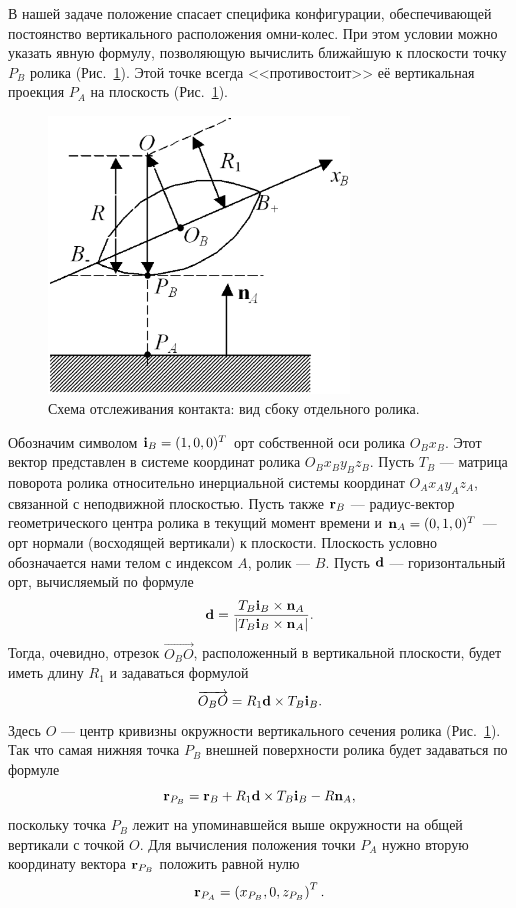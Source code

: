 \documentclass[12pt,a4paper]{article}
\begin{document}
В нашей задаче положение спасает специфика конфигурации, обеспечивающей 
постоянство вертикального расположения омни-колес. При этом условии можно
указать явную формулу, позволяющую вычислить ближайшую к плоскости точку $P_B$
ролика (Рис.~\ref{ContactScheme}). Этой точке всегда <<противостоит>> её 
вертикальная проекция $P_A$ на плоскость (Рис.~\ref{ContactScheme}).
\begin{figure}[htb]
\centering\includegraphics[width=8cm]{RollerSection.eps}
\caption{Схема отслеживания контакта: вид сбоку отдельного ролика.}
\label{ContactScheme}
\end{figure}

Обозначим символом ${\bf i}_B=(1,0,0)^T$ орт собственной оси ролика $O_Bx_B$.
Этот вектор представлен в системе координат ролика $O_Bx_By_Bz_B$. Пусть $T_B$
--- матрица поворота ролика относительно инерциальной системы координат 
$O_Ax_Ay_Az_A$, связанной с неподвижной плоскостью. Пусть также ${\bf r}_B$ ---
радиус-вектор геометрического центра ролика в текущий момент времени и 
${\bf n}_A=(0,1,0)^T$ --- орт нормали (восходящей вертикали) к плоскости. 
Плоскость условно обозначается нами телом с индексом $A$, ролик --- $B$. Пусть
${\bf d}$ --- горизонтальный орт, вычисляемый по формуле
$$
{\bf d}=\dfrac{T_B{\bf i}_B\times {\bf n}_A}
              {\left| T_B{\bf i}_B\times {\bf n}_A\right|}.
$$
Тогда, очевидно, отрезок $\overrightarrow{O_BO}$, расположенный в вертикальной
плоскости, будет иметь длину $R_1$ и задаваться формулой
$$
\overrightarrow{O_BO}=R_1{\bf d}\times T_B{\bf i}_B.
$$
Здесь $O$ --- центр кривизны окружности вертикального сечения ролика 
(Рис.~\ref{ContactScheme}). Так что самая нижняя точка $P_B$ внешней 
поверхности ролика будет задаваться по формуле
\begin{equation}
{\bf r}_{P_B}={\bf r}_B+R_1{\bf d}\times T_B{\bf i}_B-R{\bf n}_A,
\label{3_2_0}
\end{equation}
поскольку точка $P_B$ лежит на упоминавшейся выше окружности на общей вертикали 
с точкой $O$. Для вычисления положения точки $P_A$ нужно вторую координату 
вектора ${\bf r}_{P_B}$ положить равной нулю
\begin{equation}
{\bf r}_{P_A}=\left( x_{P_B},0,z_{P_B}\right) ^T.
\label{3_2_1}
\end{equation}
\end{document}
